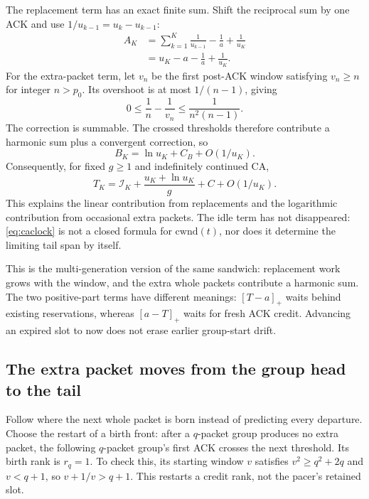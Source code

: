 \documentclass[sigconf,nonacm]{acmart}
\newcommand{\cwnd}{\mathrm{cwnd}}
\begin{document}
The replacement term has an exact finite sum. Shift the reciprocal sum by one ACK and use $1/u_{k-1}=u_k-u_{k-1}$:
\begin{equation}\begin{aligned}
 A_K&=\sum_{k=1}^K\frac1{u_{k-1}}-\frac1a+\frac1{u_K}\\
 &=u_K-a-\frac1a+\frac1{u_K}.
\end{aligned}\label{eq:careplacement}\end{equation}
For the extra-packet term, let $v_n$ be the first post-ACK window satisfying $v_n\ge n$ for integer $n>p_0$. Its overshoot is at most $1/(n-1)$, giving
\[
 0\le\frac1n-\frac1{v_n}\le\frac1{n^2(n-1)}.
\]
The correction is summable. The crossed thresholds therefore contribute a harmonic sum plus a convergent correction, so
\[
 B_K=\ln u_K+C_B+O(1/u_K).
\]
Consequently, for fixed $g\ge1$ and indefinitely continued CA,
\begin{equation}
 T_K=\mathcal I_K+\frac{u_K+\ln u_K}{g}+C+O(1/u_K).
 \label{eq:caclock}
\end{equation}
This explains the linear contribution from replacements and the logarithmic contribution from occasional extra packets. The idle term has not disappeared: \eqref{eq:caclock} is not a closed formula for $\cwnd(t)$, nor does it determine the limiting tail span by itself.


This is the multi-generation version of the same sandwich: replacement
work grows with the window, and the extra whole packets contribute a
harmonic sum. The two positive-part terms have different meanings:
$[T-a]_+$ waits behind existing reservations, whereas $[a-T]_+$ waits for
fresh ACK credit. Advancing an expired slot to now does not erase earlier
group-start drift.

\subsection{The extra packet moves from the group head to the tail}\label{sec:cafront}
Follow where the next whole packet is born instead of predicting every
departure. Choose the restart of a birth front: after a $q$-packet group
produces no extra packet, the following $q$-packet group's first ACK
crosses the next threshold. Its birth rank is $r_q=1$. To check this, its
starting window $v$ satisfies $v^2\ge q^2+2q$ and $v<q+1$, so
$v+1/v>q+1$. This restarts a credit rank, not the pacer's retained slot.
\end{document}
